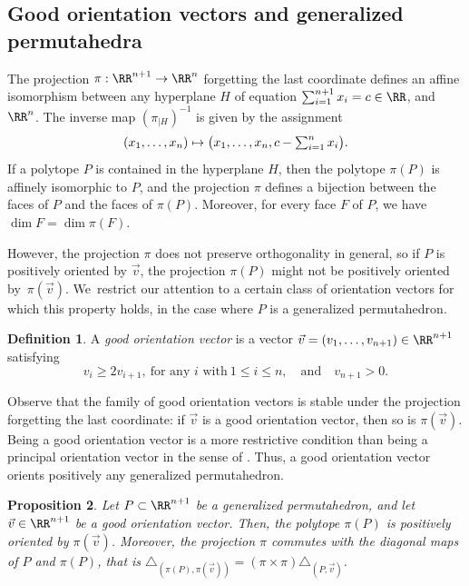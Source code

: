 \documentclass[JEP,XML,SOM,NoFloatCountersInSection,Unicode,published]{cedram}
\def\mto{\mathchoice{\longmapsto}{\mapsto}{\mapsto}{\mapsto}}
\theoremstyle{definition}
\newtheorem{definition}{Definition}[section]
\theoremstyle{plain}
\newtheorem{proposition}[definition]{Proposition}
\begin{document}
\subsection{Good orientation vectors and generalized permutahedra}

The projection $\pi : \RR^{n+1} \to \RR^n$ forgetting the last coordinate defines an affine isomorphism between any hyperplane $H$ of equation $\sum_{i=1}^{n+1} x_i = c \in \RR$, and $\RR^n$.
The inverse map $(\pi_{| H})^{-1}$ is given by the assignment
\[\textstyle
(x_1, \ldots, x_n) \mto \bigl(x_1, \ldots, x_n, c- \sum_{i=1}^{n}x_i\bigr).
\]
If a polytope $P$ is contained in the hyperplane $H$, then the polytope $\pi(P)$ is affinely isomorphic to $P$, and the projection $\pi$ defines a bijection between the faces of $P$ and the faces of $\pi(P)$. Moreover, for every face $F$ of $P$, we have $\dim F = \dim \pi(F)$.

However, the projection $\pi$ does not preserve orthogonality in general, so if $P$ is positively oriented by $\vec v$, the projection $\pi(P)$ might not be positively oriented by~$\pi(\vec v)$.
We~restrict our attention to a certain class of orientation vectors for which this property holds, in the case where $P$ is a generalized permutahedron.

\begin{definition}
\label{def:goodvector}
A \emph{good orientation vector} is a vector $\vec v=(v_1, \ldots, v_{n+1})\in \RR^{n+1}$ satisfying
\[
v_{i}\geq2v_{i+1}, \ \text{for any $i$ with}\ 1\leq i\leq n, \quad \text{and}\quad v_{n+1}>0.
\]
\end{definition}

Observe that the family of good orientation vectors is stable under the projection forgetting the last coordinate: if $\vec v$ is a good orientation vector, then so is $\pi(\vec v)$.
Being a good orientation vector is a more restrictive condition than being a principal orientation vector in the sense of \cite[Def.\,3.15]{LA21}. Thus, a good orientation vector orients positively any generalized permutahedron.

\begin{proposition}
\label{prop:goodprojection}
Let $P \subset \RR^{n+1}$ be a generalized permutahedron, and let $\vec v \in \RR^{n+1}$ be a good orientation vector.
Then, the polytope $\pi(P)$ is positively oriented by $\pi(\vec v)$.
Moreover, the projection $\pi$ commutes with the diagonal maps of $P$ and $\pi(P)$, that is $\triangle_{(\pi(P),\pi(\vec v))}=(\pi \times \pi)\triangle_{(P,\vec v)}$.
\end{proposition}
\end{document}
